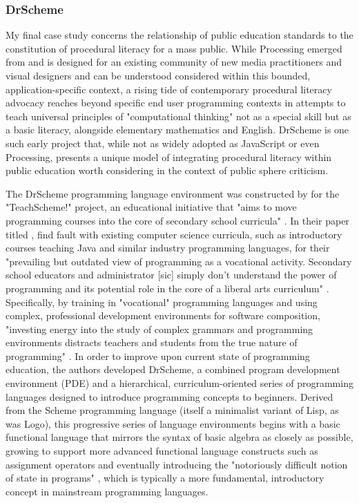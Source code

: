 \subsubsection*{DrScheme}
My final case study concerns the relationship of public education standards to the constitution of procedural literacy for a mass public. While Processing emerged from and is designed for an existing community of new media practitioners and visual designers and can be understood considered within this bounded, application-specific context, a rising tide of contemporary procedural literacy advocacy reaches beyond specific end user programming contexts in attempts to teach universal principles of "computational thinking" \autocite{Wing06} not as a special skill but as a basic literacy, alongside elementary mathematics and English. DrScheme is one such early project that, while not as widely adopted as JavaScript or even Processing, presents a unique model of integrating procedural literacy within public education worth considering in the context of public sphere criticism.

The DrScheme programming language environment was constructed by \citeauthor{Felleisen04} for the "TeachScheme!" project, an educational initiative that "aims to move programming courses into the core of secondary school curricula" \autocite[57]{Felleisen04}. In their paper titled , \citeauthor{Felleisen04} find fault with existing computer science curricula, such as introductory courses teaching Java and similar industry programming languages, for their "prevailing but outdated view of programming as a vocational activity. Secondary school educators and administrator [sic] simply don't understand the power of programming and its potential role in the core of a liberal arts curriculum" \autocite[56]{Felleisen04}. Specifically, by training in "vocational" programming languages and using complex, professional development environments for software composition, "investing energy into the study of complex grammars and programming environments distracts teachers and students from the true nature of programming" \autocite[56--7]{Felleisen04}. In order to improve upon current state of programming education, the authors developed DrScheme, a combined program development environment (PDE) and a hierarchical, curriculum-oriented series of programming languages designed to introduce programming concepts to beginners. Derived from the Scheme programming language (itself a minimalist variant of Lisp, as was Logo), this progressive series of language environments begins with a basic functional language that mirrors the syntax of basic algebra as closely as possible, growing to support more advanced functional language constructs such as assignment operators and eventually introducing the "notoriously difficult notion of state in programs" \autocite[60]{Felleisen04}, which is typically a more fundamental, introductory concept in mainstream programming languages.

